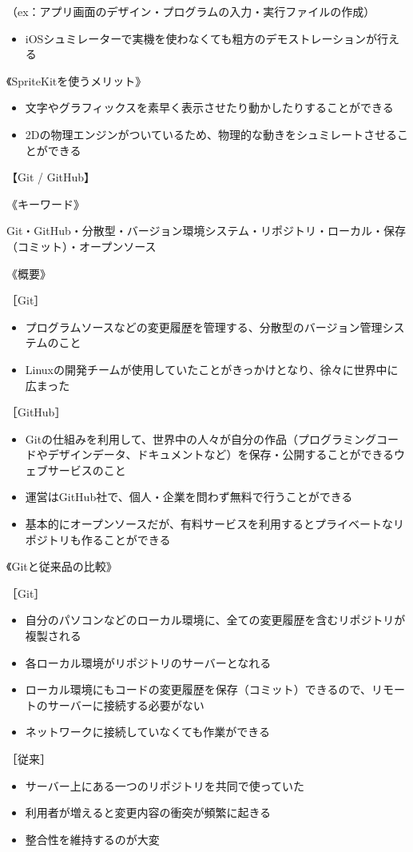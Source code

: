 \documentclass[openany,11pt,papersize]{jsbook}
\begin{document}
\begin{appendix}
\par（ex：アプリ画面のデザイン・プログラムの入力・実行ファイルの作成）
\begin{itemize}
\item iOSシュミレーターで実機を使わなくても粗方のデモストレーションが行える
\end{itemize}
\par《SpriteKitを使うメリット》
\begin{itemize}
\item 文字やグラフィックスを素早く表示させたり動かしたりすることができる
\item 2Dの物理エンジンがついているため、物理的な動きをシュミレートさせることができる
\end{itemize}

\par【Git / GitHub】
\par《キーワード》
\par Git・GitHub・分散型・バージョン環境システム・リポジトリ・ローカル・保存（コミット）・オープンソース
\par《概要》
\par［Git］
\begin{itemize}
\item プログラムソースなどの変更履歴を管理する、分散型のバージョン管理システムのこと
\item Linuxの開発チームが使用していたことがきっかけとなり、徐々に世界中に広まった
\end{itemize}
\par［GitHub］
\begin{itemize}
\item Gitの仕組みを利用して、世界中の人々が自分の作品（プログラミングコードやデザインデータ、ドキュメントなど）を保存・公開することができるウェブサービスのこと
\item 運営はGitHub社で、個人・企業を問わず無料で行うことができる
\item 基本的にオープンソースだが、有料サービスを利用するとプライベートなリポジトリも作ることができる
\end{itemize}
\par《Gitと従来品の比較》
\par［Git］
\begin{itemize}
\item 自分のパソコンなどのローカル環境に、全ての変更履歴を含むリポジトリが複製される
\item 各ローカル環境がリポジトリのサーバーとなれる
\item ローカル環境にもコードの変更履歴を保存（コミット）できるので、リモートのサーバーに接続する必要がない
\item ネットワークに接続していなくても作業ができる
\end{itemize}
\par［従来］
\begin{itemize}
\item サーバー上にある一つのリポジトリを共同で使っていた
\item 利用者が増えると変更内容の衝突が頻繁に起きる
\item 整合性を維持するのが大変
\end{itemize}



\end{appendix}
\end{document}
